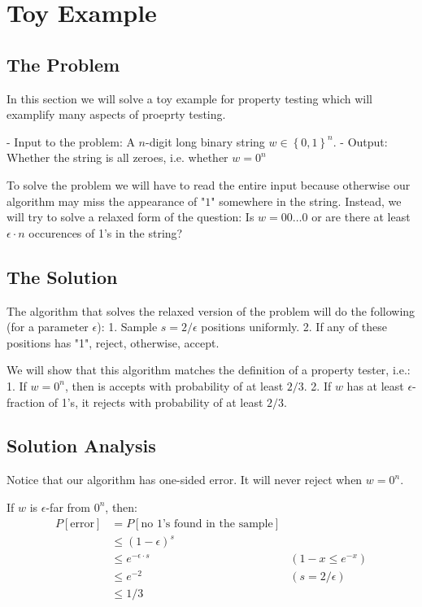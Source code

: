 \section{Toy Example}

\subsection{The Problem}

In this section we will solve a toy example for property testing which will examplify many aspects of proeprty testing.

- Input to the problem: A $n$-digit long binary string $w\in \left\{0,1\right\}^n$.
- Output: Whether the string is all zeroes, i.e. whether $w = 0^n $

To solve the problem we will have to read the entire input because otherwise our algorithm may miss the appearance of "$1$" somewhere in the string.
Instead, we will try to solve a relaxed form of the question: Is $w=00\ldots0$ or are there at least $\epsilon \cdot n$ occurences of 1's in the string?

\subsection{The Solution}

The algorithm that solves the relaxed version of the problem will do the following (for a parameter $\epsilon$):
1. Sample $s= 2/\epsilon$ positions uniformly.
2. If any of these positions has "1", reject, otherwise, accept.

We will show that this algorithm matches the definition of a property tester, i.e.:
1. If $w=0^n$, then is accepts with probability of at least $2/3$.
2. If $w$ has at least $\epsilon$-fraction of 1's, it rejects with probability of at least $2/3$.


\subsection{Solution Analysis}

Notice that our algorithm has one-sided error.
It will never reject when $w=0^n$.

If $w$ is $\epsilon$-far from $0^n$, then:
\[
\begin{aligned}
P[\text{error}] &= P[\text{no 1's found in the sample}] &\\
&\leq (1-\epsilon)^s &\\
&\leq e^{-\epsilon \cdot s} & (1-x \leq e^{-x})\\
&\leq e^{-2} & (s=2/\epsilon)\\
&\leq 1/3
\end{aligned}
\]

